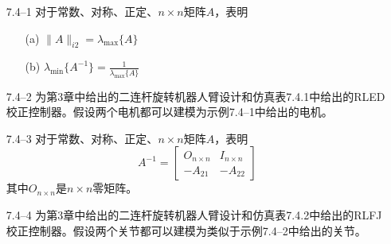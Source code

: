 \documentclass[UTF8]{ctexart}
\begin{document}
\begin{enumerate}
\item[7.4--1] 对于常数、对称、正定、$n \times n$矩阵$A$，表明
\begin{enumerate}
\item[(a)] $\|A\|_{i2} = \lambda_{\max}\{A\}$
\item[(b)] $\lambda_{\min}\{A^{-1}\} = \frac{1}{\lambda_{\max}\{A\}}$
\end{enumerate}

\item[7.4--2] 为第3章中给出的二连杆旋转机器人臂设计和仿真表7.4.1中给出的RLED校正控制器。假设两个电机都可以建模为示例7.4--1中给出的电机。

\item[7.4--3] 对于常数、对称、正定、$n \times n$矩阵$A$，表明
\[ A^{-1} = \begin{bmatrix} O_{n \times n} & I_{n \times n} \\ -A_{21} & -A_{22} \end{bmatrix} \]
其中$O_{n \times n}$是$n \times n$零矩阵。

\item[7.4--4] 为第3章中给出的二连杆旋转机器人臂设计和仿真表7.4.2中给出的RLFJ校正控制器。假设两个关节都可以建模为类似于示例7.4--2中给出的关节。
\end{enumerate}
\end{document}
